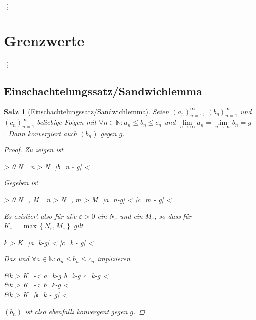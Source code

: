 \documentclass{article}
\newtheorem{thm}{Satz}[section]
\newenvironment{aleq*}{\begin{equation*}\begin{aligned}}{\end{aligned}\end{equation*}}
\begin{document}
	\vdots
	
	\section{Grenzwerte}
	\vdots
	\subsection{Einschachtelungssatz/Sandwichlemma}
	\begin{thm}[Einschachtelungssatz/Sandwichlemma]
		Seien \((a_n)_{n=1}^\infty\), \((b_n)_{n=1}^\infty\) und \((c_n)_{n=1}^\infty\) beliebige Folgen mit \(\forall n \in \mathbb{N} \colon a_n \leq b_n \leq c_n\) und \(\lim\limits_{n \to \infty} a_n = \lim\limits_{n \to \infty} b_n = g\). Dann konvergiert auch \((b_n)\) gegen \(g\).
		
		\begin{proof}
			Zu zeigen ist
			\begin{aleq*}
				\forall \varepsilon > 0 \colon \exists N_\varepsilon \in {} \colon \forall n > N_\varepsilon \colon |b_n - g| < \varepsilon {}
			\end{aleq*}
			\par
			Gegeben ist
			\begin{aleq*}
				\label{gegebenSandwich}
				\forall \varepsilon > 0 \colon \exists N_\varepsilon, M_\varepsilon \in {} \colon \forall n > N_\varepsilon, m > M_\varepsilon \colon |a_n-g| < \varepsilon \land |c_m - g| < \varepsilon \text{.}
			\end{aleq*}
			\par
			Es existiert also für alle \(\varepsilon > 0\) ein \(N_\varepsilon\) und ein \(M_\varepsilon\), so dass für \(K_\varepsilon = \max \left\lbrace N_\varepsilon, M_\varepsilon \right\rbrace\) gilt
			\begin{aleq*}
				\forall k > K_\varepsilon \colon |a_k-g| < \varepsilon \land |c_k - g| < \varepsilon {}
			\end{aleq*}
			\par
			Das und \(\forall n \in \mathbb{N} \colon a_n \leq b_n \leq c_n\) implizieren
			\begin{aleq*}
				&\forall k > K_\varepsilon \colon -\varepsilon < a_k-g \leq b_k-g \leq c_k-g < \varepsilon \\
				\implies &\forall k > K_\varepsilon \colon -\varepsilon < b_k-g < \varepsilon \\
				\iff &\forall k > K_\varepsilon \colon |b_k - g| < \varepsilon
			\end{aleq*}
			\par
			\((b_n)\) ist also ebenfalls konvergent gegen \(g\).
		\end{proof}
	\end{thm}
	
\end{document}
